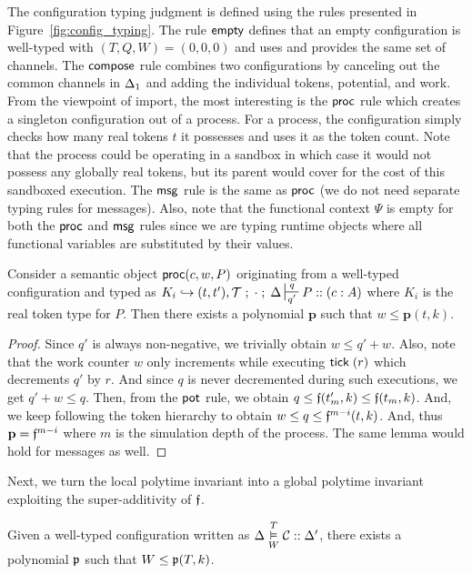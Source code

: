 The configuration typing judgment is defined using
the rules presented in Figure~\ref{fig:config_typing}.
%
The rule $\mathsf{empty}$ defines that an empty configuration
is well-typed with $(T, Q, W) = (0, 0, 0)$ and uses and
provides the same set of channels.
The $\mathsf{compose}$ rule combines two configurations by canceling out
the common channels in $\Delta_1$ and adding the individual tokens, potential, and work.
From the viewpoint of import, the most interesting is the $\mathsf{proc}$ rule
which creates a singleton configuration out of a process.
For a process, the configuration simply checks how many real tokens $t$ it possesses and
uses it as the token count.
Note that the process could be operating in a sandbox in which case it would not possess
any globally real tokens, but its parent would cover for the cost of this sandboxed execution.
The $\mathsf{msg}$ rule is the same as $\mathsf{proc}$ (we do not need separate typing rules for messages).
Also, note that the functional context $\Psi$ is empty for both the $\mathsf{proc}$ and $\mathsf{msg}$
rules since we are typing runtime objects where all functional variables are substituted
by their values.

\begin{lemma}\label{lem:local_ppt}
  Consider a semantic object $\mathsf{proc}(c, w, P)$ originating from a well-typed configuration and
  typed as $K_i \hookrightarrow (t, t'), \Tokens \semi \cdot \semi \D \entailpot{q}{q'} P :: (c : A)$
  where $K_i$ is the real token type for $P$.
  Then there exists a polynomial $\mathbf{p}$ such that $w \leq \mathbf{p}(t, k)$.
\end{lemma}

\begin{proof}
  Since $q'$ is always non-negative, we trivially obtain $w \leq q'+w$.
  Also, note that the work counter $w$ only increments while executing $\mathsf{tick} \; (r)$
  which decrements $q'$ by $r$.
  And since $q$ is never decremented during such executions, we get $q'+w \leq q$.
  Then, from the $\mathsf{pot}$ rule, we obtain $q \leq \mathfrak{f}(t_m', k) \leq \mathfrak{f}(t_m, k)$.
  And, we keep following the token hierarchy to obtain
  $w \leq q \leq \mathfrak{f}^{m-i}(t, k)$.
  And, thus $\mathbf{p} = \mathfrak{f}^{m-i}$ where $m$ is the simulation depth of the process.
  The same lemma would hold for messages as well.
\end{proof}

Next, we turn the local polytime invariant into a global polytime invariant exploiting
the super-additivity of $\mathfrak{f}$.

\begin{theorem}
  Given a well-typed configuration written as $\Delta \overset{T}{\underset{W}{\vDash}} \mathcal{C} :: \Delta'$,
  there exists a polynomial $\mathfrak{p}$ such that $W \leq \mathfrak{p}(T, k)$.
\end{theorem}

